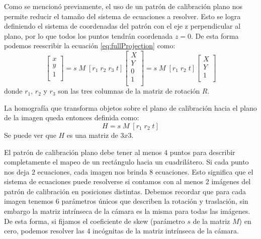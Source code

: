 Como se mencionó previamente, el uso de un patrón de calibración plano nos permite reducir el tamaño del sistema de ecuaciones a resolver. Esto se logra definiendo el sistema de coordenadas del patrón con el eje z perpendicular al plano, por lo que todos los puntos tendrán coordenada $z=0$. De esta forma podemos reescribir la ecuación \eqref{eq:fullProjection} como:
\begin{equation*}
	\begin{bmatrix}
	x \\
	y \\
	1 \\
	\end{bmatrix}
	= s \; M \; [r_1 \; r_2 \; r_3 \; t]
	\begin{bmatrix}
	X \\
	Y \\
	0 \\
	1 \\
	\end{bmatrix}
	= s \; M \; [r_1 \; r_2 \; t] 
	\begin{bmatrix}
	X \\
	Y \\
	1 \\
	\end{bmatrix}
\end{equation*}
donde $r_1$, $r_2$ y $r_3$ son las tres columnas de la matriz de rotación $R$.

La homografía que transforma objetos sobre el plano de calibración hacia el plano de la imagen queda entonces definida como:
\begin{equation}\label{eq:homography}
    H = s \; M \; [r_1 \; r_2 \; t]
\end{equation}
Se puede ver que $H$ es una matriz de $3x3$.

El patrón de calibración plano debe tener al menos $4$ puntos para describir completamente el mapeo de un rectángulo hacia un cuadrilátero. Si cada punto nos deja $2$ ecuaciones, cada imagen nos brinda $8$ ecuaciones. Esto significa que el sistema de ecuaciones puede resolverse si contamos con al menos $2$ imágenes del patrón de calibración en posiciones distintas. Debemos recordar que para cada imagen tenemos $6$ parámetros únicos que describen la rotación y traslación, sin embargo la matriz intrínseca de la cámara es la misma para todas las imágenes. De esta forma, si fijamos el coeficiente de skew (parámetro $s$ de la matriz $M$) en cero, podemos resolver las $4$ incógnitas de la matriz intrínseca de la cámara.

